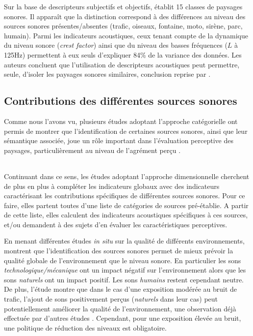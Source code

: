 Sur la base de descripteurs subjectifs et objectifs, \citep{torija2013application} établit 15 classes de paysages sonores. Il apparaît que la distinction correspond à des différences au niveau des sources sonores présentes/absentes (trafic, oiseaux, fontaine, moto, sirène, parc, humain). Parmi les indicateurs acoustiques, ceux tenant compte de la dynamique du niveau sonore (\emph{crest factor}) ainsi que du niveau des basses fréquences ($L$ à 125Hz) permettent à eux seuls d'expliquer 84\% de la variance des données. Les auteurs concluent que l'utilisation de descripteurs acoustiques peut permettre, seule, d'isoler les paysages sonores similaires, conclusion reprise par \citep{rychtarikova2013soundscape}.


\subsection{Contributions des différentes sources sonores}
\label{sec:ch3_contribSource}

Comme nous l'avons vu, plusieurs études adoptant l'approche catégorielle ont permis de montrer que l'identification de certaines sources sonores, ainsi que leur sémantique associée, joue un rôle important dans l'évaluation perceptive des paysages, particulièrement au niveau de l'agrément perçu \citep{guastavino2006ideal,szeremeta2009analysis}.

\\

Continuant dans ce sens, les études adoptant l'approche dimensionnelle cherchent de plus en plus à compléter les indicateurs globaux avec des indicateurs caractérisant les contributions spécifiques de différentes sources sonores. Pour ce faire, elles partent toutes d'une liste de catégories de sources pré-établie. A partir de cette liste, elles calculent des indicateurs acoustiques spécifiques à ces sources, et/ou demandent à des sujets d'en évaluer les caractéristiques perceptives.

En menant différentes études \emph{in situ} sur la qualité de différents environnements, \citep{nilsson2007acoustic,nilsson2007soundscape} montrent que l'identification des sources sonores permet de mieux prévoir la qualité globale de l'environnement que le niveau sonore. En particulier les sons \emph{technologique/mécanique} ont un impact négatif sur l'environnement alors que les sons \emph{naturels} ont un impact positif. Les sons \emph{humains} restent cependant neutre. De plus, l'étude montre que dans le cas d'une exposition modérée au bruit de trafic, l'ajout de sons positivement perçus (\emph{naturels} dans leur cas) peut potentiellement améliorer la qualité de l'environnement, une observation déjà effectuée par d'autres études \citep{hong2013designing,galbrun2012perceptual}. Cependant, pour une exposition élevée au bruit, une politique de réduction des niveaux est obligatoire.

